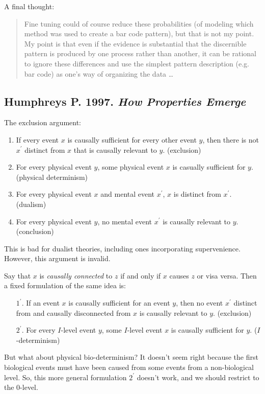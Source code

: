 \documentclass{article}
\newcommand{\ti}[1]{\textit{#1}}
\newcommand{\p}{^\prime}
\newcommand{\annbibtitle}[2]{\subsection*{#1. \ti{#2}}}
\begin{document}
A final thought:
\begin{quote}
Fine tuning could of course reduce these probabilities (of modeling which method was used to create a bar code pattern), but that is not my point. My point is that even if the evidence is substantial that the discernible pattern is produced by one process rather than another, it can be rational to ignore these differences and use the simplest pattern description (e.g. bar code) as one's way of organizing the data \dots
\end{quote}

\annbibtitle{Humphreys P. 1997}{How Properties Emerge}

The exclusion argument:

\begin{enumerate}
    \item If every event $x$ is causally sufficient for every other event $y$, then there is not $x\p$ distinct from $x$ that is causally relevant to $y$. (exclusion)
    \item For every physical event $y$, some physical event $x$ is casually sufficient for $y$. (physical determinism)
    \item For every physical event $x$ and mental event $x\p$, $x$ is distinct from $x\p$. (dualism)
    \item For every physical event $y$, no mental event $x\p$ is causally relevant to $y$. (conclusion)
\end{enumerate}

This is bad for dualist theories, including ones incorporating supervenience. However, this argument is invalid.

Say that $x$ is \ti{causally connected} to $z$ if and only if $x$ causes $z$ or visa versa. Then a fixed formulation of the same idea is:

\begin{enumerate}
    \item[$1\p$.] If an event $x$ is causally sufficient for an event $y$, then no event $x\p$ distinct from and causally disconnected from $x$ is causally relevant to $y$. (exclusion)
    \item[$2\p$.] For every $I$-level event $y$, some $I$-level event $x$ is causally sufficient for $y$. ($I$-determinism)
\end{enumerate}

But what about physical bio-determinism? It doesn't seem right because the first biological events must have been caused from some events from a non-biological level. So, this more general formulation $2\p$ doesn't work, and we should restrict to the 0-level.
\end{document}
